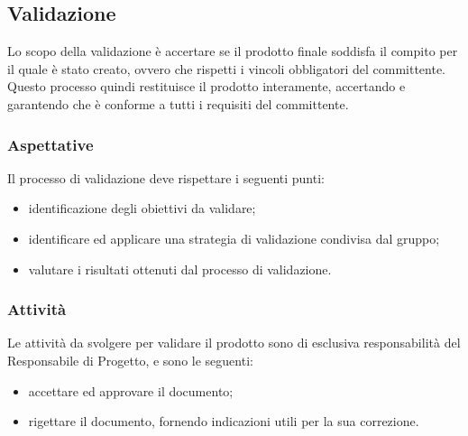 \subsection{Validazione}
Lo scopo della validazione è accertare se il prodotto finale soddisfa il compito per il quale è stato creato, ovvero che rispetti i vincoli obbligatori del committente. Questo processo quindi restituisce il prodotto interamente, accertando e garantendo che è conforme a tutti i requisiti del committente.

\subsubsection{Aspettative}
Il processo di validazione deve rispettare i seguenti punti:
\begin{itemize}
	\item identificazione degli obiettivi da validare;
	\item identificare ed applicare una strategia di validazione condivisa dal gruppo;
	\item valutare i risultati ottenuti dal processo di validazione.
\end{itemize}

\subsubsection{Attività}
Le attività da svolgere per validare il prodotto sono di esclusiva responsabilità del Responsabile di Progetto, e sono le seguenti:
\begin{itemize}
	\item accettare ed approvare il documento;
	\item rigettare il documento, fornendo indicazioni utili per la sua correzione.
\end{itemize}


